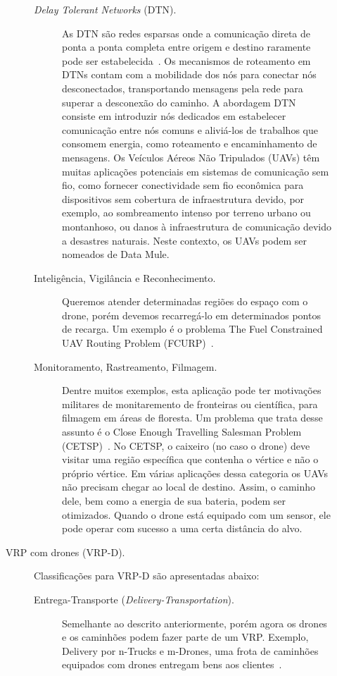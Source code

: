 \documentclass[12pt, a4paper]{article}
\begin{document}
\begin{description}
\begin{description}
\begin{description}
			\item [\textit{Delay Tolerant Networks} (DTN).] As DTN são redes esparsas onde a comunicação direta de ponta a ponta completa entre origem e destino raramente pode ser estabelecida~\cite{barroca2018improving}. Os mecanismos de roteamento em DTNs contam com a mobilidade dos nós para conectar nós desconectados, transportando mensagens pela rede para superar a desconexão do caminho. A abordagem DTN consiste em introduzir nós dedicados em estabelecer comunicação entre nós comuns e aliviá-los de trabalhos que consomem energia, como roteamento e encaminhamento de mensagens. Os Veículos Aéreos Não Tripulados (UAVs) têm muitas aplicações potenciais em sistemas de comunicação sem fio, como fornecer conectividade sem fio econômica para dispositivos sem cobertura de infraestrutura devido, por exemplo, ao sombreamento intenso por terreno urbano ou montanhoso, ou danos à infraestrutura de comunicação devido a desastres naturais. Neste contexto, os UAVs podem ser nomeados de Data Mule.
			
			\item [Inteligência, Vigilância e Reconhecimento.] Queremos atender determinadas regiões do espaço com o drone, porém devemos recarregá-lo em determinados pontos de recarga. Um exemplo é o problema The Fuel Constrained UAV Routing Problem (FCURP)~\cite{sundar2013algorithms}.
			
			\item [Monitoramento, Rastreamento, Filmagem.] Dentre muitos exemplos, esta aplicação pode ter motivações militares de monitaremento de fronteiras ou científica, para filmagem em áreas de floresta. Um problema que trata desse assunto é o Close Enough Travelling Salesman Problem (CETSP)~\cite{coutinho2016branch}. No CETSP, o caixeiro (no caso o drone) deve visitar uma região específica que contenha o vértice e não o próprio vértice. Em várias aplicações dessa categoria os UAVs não precisam chegar ao local de destino. Assim, o caminho dele, bem como a energia de sua bateria, podem ser otimizados. Quando o drone está equipado com um sensor, ele pode operar com sucesso a uma certa distância do alvo.
		\end{description}
		\item [VRP com drones (VRP-D).] Classificações para VRP-D são apresentadas abaixo:
		\begin{description}
			\item [Entrega-Transporte (\textit{Delivery-Transportation}).] Semelhante ao descrito anteriormente, porém agora os drones e os caminhões podem fazer parte de um VRP. Exemplo, Delivery por n-Trucks e m-Drones, uma frota de caminhões equipados com drones entregam bens aos clientes~\cite{wang2017vehicle}.
			

\end{description}
\end{description}
\end{description}
\end{document}
